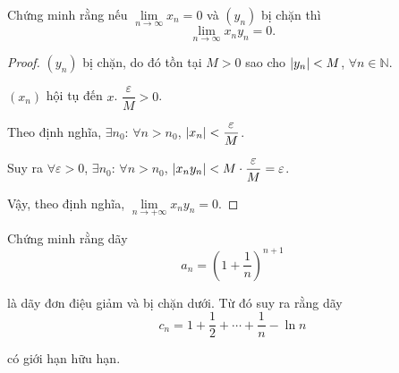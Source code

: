 \documentclass[class=analysis,crop=false]{standalone}
\begin{document}
\begin{exercise}
    Chứng minh rằng nếu $\lim\limits_{n\to\infty} x_{n} = 0$ và $(y_{n})$ bị chặn thì
    \[
        \lim\limits_{n\to\infty} x_{n}y_{n} = 0.
    \]
\end{exercise}

\begin{proof}
    \par $(y_{n})$ bị chặn, do đó tồn tại $M > 0$ sao cho $\left\vert{y_{n}}\right\vert < M$, $\forall n\in\mathbb{N}$.
    \par $(x_{n})$ hội tụ đến $x$. $\dfrac{\varepsilon}{M} > 0$.
    \par Theo định nghĩa, $\exists n_{0}$: $\forall n > n_{0}$, $\left\vert{x_{n}}\right\vert < \dfrac{\varepsilon}{M}$.
    \par Suy ra $\forall\varepsilon > 0$, $\exists n_{0}$: $\forall n > n_{0}$, $\left\vert{x_{n}y_{n}}\right\vert < M\cdot\dfrac{\varepsilon}{M} = \varepsilon$.
    \par Vậy, theo định nghĩa, $\lim\limits_{n\to+\infty} x_{n}y_{n} = 0$.
\end{proof}

\begin{exercise}
    Chứng minh rằng dãy
    \[
        a_{n} = \left(1 + \frac{1}{n}\right)^{n+1}
    \]
    \par là dãy đơn điệu giảm và bị chặn dưới. Từ đó suy ra rằng dãy
    \[
        c_{n} = 1 + \frac{1}{2} + \cdots + \frac{1}{n} - \ln n
    \]
    \par có giới hạn hữu hạn.
\end{exercise}
\end{document}
